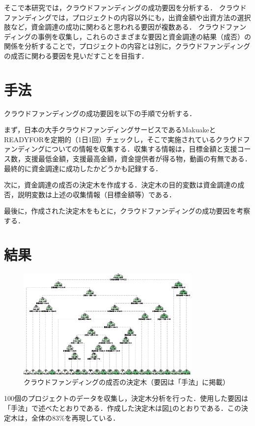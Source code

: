 \documentclass[uplatex,twocolumn]{jsarticle}
\begin{document}
そこで本研究では，クラウドファンディングの成功要因を分析する．
クラウドファンディングでは，プロジェクトの内容以外にも，出資金額や出資方法の選択肢など，資金調達の成功に関わると思われる要因が複数ある．
クラウドファンディングの事例を収集し，これらのさまざまな要因と資金調達の結果（成否）の関係を分析することで，プロジェクトの内容とは別に，クラウドファンディングの成否に関わる要因を見いだすことを目指す．

\section{手法}
クラウドファンディングの成功要因を以下の手順で分析する．

まず，日本の大手クラウドファンディングサービスであるMakuakeとREADYFORを定期的（1日1回）チェックし，そこで実施されているクラウドファンディングについての情報を収集する．収集する情報は，目標金額と支援コース数，支援最低金額，支援最高金額，資金提供者が得る物，動画の有無である．最終的に資金調達に成功したかどうかも記録する．

次に，資金調達の成否の決定木を作成する．決定木の目的変数は資金調達の成否，説明変数は上述の収集情報（目標金額等）である．

最後に，作成された決定木をもとに，クラウドファンディングの成功要因を考察する．

\section{結果}

\begin{figure}
\centering
\includegraphics[width=9cm]{figure.eps}
\caption{クラウドファンディングの成否の決定木（要因は「手法」に掲載）}\label{決定木}
\end{figure}

100個のプロジェクトのデータを収集し，決定木分析を行った．使用した要因は「手法」で述べたとおりである．作成した決定木は図\ref{決定木}のとおりである．この決定木は，全体の83\%を再現している．
\end{document}
